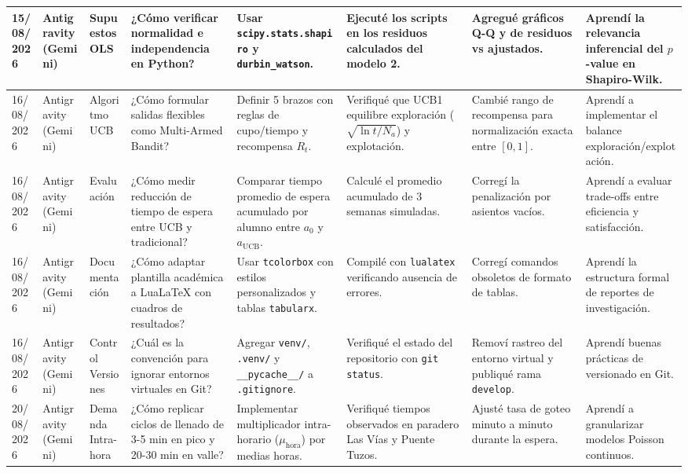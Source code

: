 \begin{landscape}
\begin{center}
\begin{tabularx}{\linewidth}{p{1.3cm} p{1.6cm} p{1.6cm} X X X X X}
		\midrule
		15/08/2026 & Antigravity (Gemini) & Supuestos OLS & ¿Cómo verificar normalidad e independencia en Python? & Usar \texttt{scipy.stats.shapiro} y \texttt{durbin\_watson}. & Ejecuté los scripts en los residuos calculados del modelo 2. & Agregué gráficos Q-Q y de residuos vs ajustados. & Aprendí la relevancia inferencial del $p$-value en Shapiro-Wilk. \\
		\midrule
		16/08/2026 & Antigravity (Gemini) & Algoritmo UCB & ¿Cómo formular salidas flexibles como Multi-Armed Bandit? & Definir 5 brazos con reglas de cupo/tiempo y recompensa $R_t$. & Verifiqué que UCB1 equilibre exploración ($\sqrt{\ln t / N_a}$) y explotación. & Cambié rango de recompensa para normalización exacta entre $[0, 1]$. & Aprendí a implementar el balance exploración/explotación. \\
		\midrule
		16/08/2026 & Antigravity (Gemini) & Evaluación & ¿Cómo medir reducción de tiempo de espera entre UCB y tradicional? & Comparar tiempo promedio de espera acumulado por alumno entre $a_0$ y $a_{\text{UCB}}$. & Calculé el promedio acumulado de 3 semanas simuladas. & Corregí la penalización por asientos vacíos. & Aprendí a evaluar trade-offs entre eficiencia y satisfacción. \\
		\midrule
		16/08/2026 & Antigravity (Gemini) & Documentación & ¿Cómo adaptar plantilla académica a LuaLaTeX con cuadros de resultados? & Usar \texttt{tcolorbox} con estilos personalizados y tablas \texttt{tabularx}. & Compilé con \texttt{lualatex} verificando ausencia de errores. & Corregí comandos obsoletos de formato de tablas. & Aprendí la estructura formal de reportes de investigación. \\
		\midrule
		16/08/2026 & Antigravity (Gemini) & Control Versiones & ¿Cuál es la convención para ignorar entornos virtuales en Git? & Agregar \texttt{venv/}, \texttt{.venv/} y \texttt{\_\_pycache\_\_/} a \texttt{.gitignore}. & Verifiqué el estado del repositorio con \texttt{git status}. & Removí rastreo del entorno virtual y publiqué rama \texttt{develop}. & Aprendí buenas prácticas de versionado en Git. \\
		\midrule
		20/08/2026 & Antigravity (Gemini) & Demanda Intra-hora & ¿Cómo replicar ciclos de llenado de 3-5 min en pico y 20-30 min en valle? & Implementar multiplicador intra-horario ($\mu_{\text{hora}}$) por medias horas. & Verifiqué tiempos observados en paradero Las Vías y Puente Tuzos. & Ajusté tasa de goteo minuto a minuto durante la espera. & Aprendí a granularizar modelos Poisson continuos. \\

\end{tabularx}
\end{center}
\end{landscape}
